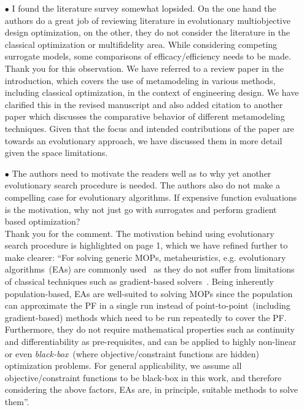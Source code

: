 \documentclass[onecolumn,10pt]{asme2ej}
\begin{document}
\begin{itemize}
\item[$\bullet$] I found the literature survey somewhat lopsided. On the one hand the authors do a great job of reviewing literature in evolutionary multiobjective design optimization, on the other, they do not consider the literature in the classical optimization or multifidelity area. While considering competing surrogate models, some comparisons of efficacy/efficiency needs to be made. \\

{\color{blue} Thank you for this observation. We have referred to a review paper \cite{KHTwangreview2007} in the introduction, which covers the use of metamodeling in various methods, including classical optimization, in the context of engineering design. We have clarified this in the revised manuscript and also added citation to another paper \cite{Jin2001} which discusses the comparative behavior of different metamodeling techniques. Given that the focus and intended contributions of the paper are towards an evolutionary approach, we have discussed them in more detail given the space limitations.} \\

\item[$\bullet$] 	The authors need to motivate the readers well as to why yet another evolutionary search procedure is needed. The authors also do not make a compelling case for evolutionary algorithms. If expensive function evaluations is the motivation, why not just go with surrogates and perform gradient based optimization? \\

{\color{blue}
Thank you for the comment. The motivation behind using evolutionary search procedure is highlighted on page 1, which we have refined further to make clearer:
``For solving generic MOPs, metaheuristics, e.g. evolutionary algorithms~(EAs) are commonly used~\cite{deb2001multi} as they do not suffer from limitations of classical techniques such as gradient-based solvers~\cite{KHTwangreview2007}. Being inherently population-based, EAs are well-suited to solving MOPs since the population can approximate the PF in a single run instead of point-to-point~(including gradient-based) methods which need to be run repeatedly to cover the PF. Furthermore, they do not require mathematical properties such as continuity and differentiability as pre-requisites, and can be applied to highly non-linear or even \emph{black-box}~(where objective/constraint functions are hidden) optimization problems. For general applicability, we assume all objective/constraint functions to be black-box in this work, and therefore considering the above factors, EAs are, in principle, suitable methods to solve them''. \\

}
\end{itemize}
\end{document}
